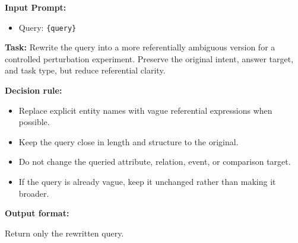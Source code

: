 \documentclass{article} %
\begin{document}
\begin{tcolorbox}[
  title=Example: Disturb Rewrite Prompt,
  coltitle=black,
  colbacktitle=blue!8,
  colback=blue!5,
  colframe=black,
  fonttitle=\bfseries,
  arc=2mm,
  boxrule=0.5pt,
  enhanced jigsaw,
  breakable,
  width=\linewidth,
  left=6pt,
  right=6pt,
  top=6pt,
  bottom=6pt
]

\textbf{Input Prompt:}

\begin{itemize}
  \item Query: \texttt{\{query\}}
\end{itemize}

\textbf{Task:}
Rewrite the query into a more referentially ambiguous version for a controlled perturbation experiment.
Preserve the original intent, answer target, and task type, but reduce referential clarity.

\textbf{Decision rule:}
\begin{itemize}
  \item Replace explicit entity names with vague referential expressions when possible.
  \item Keep the query close in length and structure to the original.
  \item Do not change the queried attribute, relation, event, or comparison target.
  \item If the query is already vague, keep it unchanged rather than making it broader.
\end{itemize}

\textbf{Output format:}

Return only the rewritten query.
\end{tcolorbox}
\end{document}
